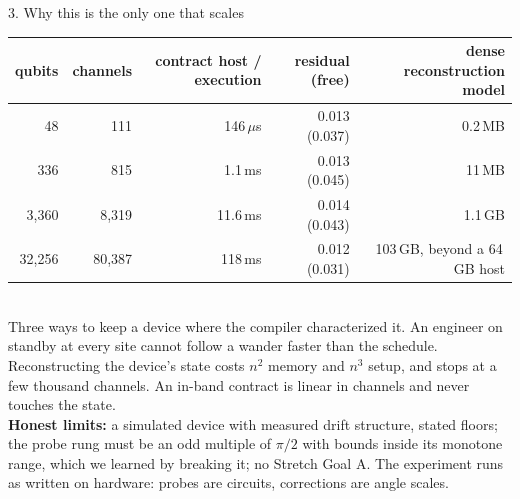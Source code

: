 \documentclass[10pt,aspectratio=169]{beamer}
\begin{document}
\begin{frame}{3. Why this is the only one that scales}\small
\begin{tabular}{r r r r r}\toprule qubits & channels & contract host / execution & residual (free) & dense reconstruction model\\\midrule 48 & 111 & 146\,$\mu$s & 0.013 (0.037) & 0.2\,MB\\ 336 & 815 & 1.1\,ms & 0.013 (0.045) & 11\,MB\\ 3,360 & 8,319 & 11.6\,ms & 0.014 (0.043) & 1.1\,GB\\ 32,256 & 80,387 & 118\,ms & 0.012 (0.031) & 103\,GB, beyond a 64\,GB host\\\bottomrule\end{tabular}\\[10pt]
Three ways to keep a device where the compiler characterized it. An engineer on standby at every site cannot follow a wander faster than the schedule. Reconstructing the device's state costs $n^2$ memory and $n^3$ setup, and stops at a few thousand channels. An in-band contract is linear in channels and never touches the state.\\[8pt]
\textbf{Honest limits:} a simulated device with measured drift structure, stated floors; the probe rung must be an odd multiple of $\pi/2$ with bounds inside its monotone range, which we learned by breaking it; no Stretch Goal A. The experiment runs as written on hardware: probes are circuits, corrections are angle scales.
\end{frame}
\end{document}
